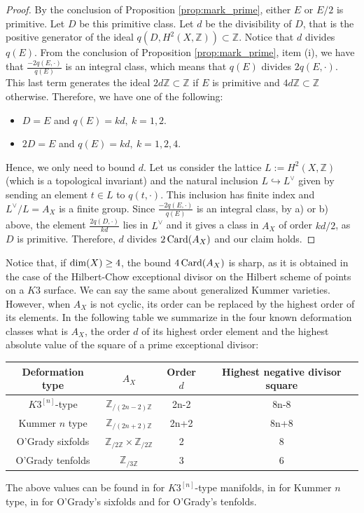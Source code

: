 \documentclass[12pt,reqno]{amsart}
\def\card{\mathop{\rm Card}\nolimits}
\def\dim{\mathop{\rm dim}\nolimits}
\theoremstyle{plain}
\theoremstyle{definition}
\begin{document}
\begin{proof}  
By the conclusion of Proposition \ref{prop:mark_prime}, either $E$ or $E/2$ is primitive. Let $D$ be this primitive class. Let $d$ be the divisibility of $D$, that is the positive generator of the ideal $q(D,H^2(X,\mathbb{Z}))\subset \mathbb{Z}$. Notice that $d$ divides $q(E)$. From the conclusion of Proposition \ref{prop:mark_prime}, item (i), we have that $\frac{-2q(E,\cdot)}{q(E)} $ is an integral class, which means that $q(E)$ divides $2q(E,\cdot)$. This last term generates the ideal $2d\mathbb{Z}\subset \mathbb{Z}$ if $E$ is primitive and $4d\mathbb{Z}\subset \mathbb{Z}$ otherwise. Therefore, we have one of the following:
\begin{itemize}
\item[a)] $D=E$ and $q(E)=kd,\ k=1,2$.
\item[b)] $2D=E$ and $q(E)=kd,\ k=1,2,4$.
\end{itemize}
Hence, we only need to bound $d$. Let us consider the lattice $L:=H^2(X,\mathbb{Z})$ (which is a topological invariant) and the natural inclusion $L\hookrightarrow L^\vee$ given by sending an element $t\in L$ to $q(t,\cdot)$. This inclusion has finite index and $L^\vee/L=A_X$ is a finite group.  Since $\frac{-2q(E,\cdot)}{q(E)} $ is an integral class, by a) or b) above,   the element $\frac{2q(D,\cdot)}{kd}$ lies in $L^\vee$ and it gives a class in $A_X$ of order $kd/2$, as $D$ is primitive. Therefore, $d$ divides $2\card(A_X)$ and our claim holds.
\end{proof}
Notice that, if $\dim(X)\geq 4$, the bound $4\card(A_X)$ is sharp, as it is obtained in the case of the Hilbert-Chow exceptional divisor on the Hilbert scheme of points on a $K3$ surface. We can say the same about generalized Kummer varieties. However, when $A_X$ is not cyclic, its order can be replaced by the highest order of its elements. In the following table we summarize in the four known deformation classes what is $A_X$, the order $d$ of its highest order element and the highest absolute value of the square of a prime exceptional divisor:
\begin{center}
	\begin{tabular}{|c|c|c|c|}
\hline
Deformation type & $A_X$ & Order $d$ & Highest negative divisor square \\
\hline
$K3^{[n]}$-type & $\mathbb{Z}_{/(2n-2)\mathbb{Z}}$ & 2n-2 & 8n-8 \\
\hline
Kummer $n$ type & $\mathbb{Z}_{/(2n+2)\mathbb{Z}}$ & 2n+2 & 8n+8 \\
\hline
O'Grady sixfolds & $\mathbb{Z}_{/2\mathbb{Z}}\times\mathbb{Z}_{/2\mathbb{Z}}$ & 2 & 8\\
\hline
O'Grady tenfolds & $\mathbb{Z}_{/3\mathbb{Z}}$ & 3 & 6 \\
\hline 
\end{tabular}
 \end{center}
The above values can be found in \cite[Section 9]{mark_tor} for $K3^{[n]}$-type manifolds, in \cite{yoshi} for Kummer $n$ type, in \cite{rap_form} for O'Grady's sixfolds and \cite{mark_g2} for O'Grady's tenfolds.
\end{document}
